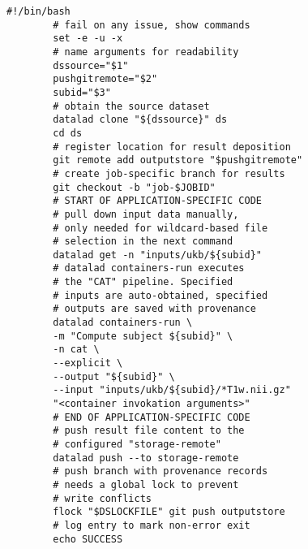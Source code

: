 \begin{Listing} [H]
	\centering
	\begin{lstlisting}[multicols=2]
		#!/bin/bash
		# fail on any issue, show commands
		set -e -u -x
		# name arguments for readability
		dssource="$1"
		pushgitremote="$2"
		subid="$3"
		# obtain the source dataset
		datalad clone "${dssource}" ds
		cd ds
		# register location for result deposition
		git remote add outputstore "$pushgitremote"
		# create job-specific branch for results
		git checkout -b "job-$JOBID"
		# START OF APPLICATION-SPECIFIC CODE
		# pull down input data manually,
		# only needed for wildcard-based file
		# selection in the next command
		datalad get -n "inputs/ukb/${subid}"
		# datalad containers-run executes
		# the "CAT" pipeline. Specified
		# inputs are auto-obtained, specified
		# outputs are saved with provenance
		datalad containers-run \
		-m "Compute subject ${subid}" \
		-n cat \
		--explicit \
		--output "${subid}" \
		--input "inputs/ukb/${subid}/*T1w.nii.gz"
		"<container invokation arguments>"
		# END OF APPLICATION-SPECIFIC CODE
		# push result file content to the
		# configured "storage-remote"
		datalad push --to storage-remote
		# push branch with provenance records
		# needs a global lock to prevent
		# write conflicts
		flock "$DSLOCKFILE" git push outputstore
		# log entry to mark non-error exit
		echo SUCCESS
	\end{lstlisting}


\end{Listing}
